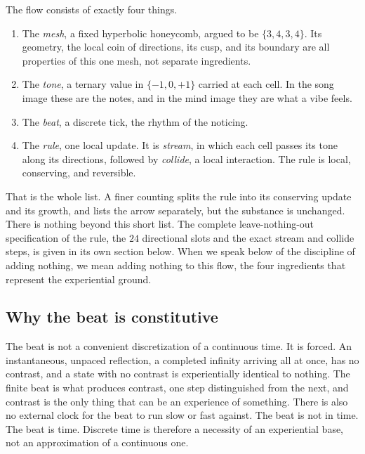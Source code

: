\begin{axiom}
The flow consists of exactly four things.
\begin{enumerate}
\item The \emph{mesh}, a fixed hyperbolic honeycomb, argued to be $\{3,4,3,4\}$. Its geometry, the local coin of
directions, its cusp, and its boundary are all properties of this one mesh, not separate ingredients.
\item The \emph{tone}, a ternary value in $\{-1, 0, +1\}$ carried at each cell. In the song image these are the
notes, and in the mind image they are what a vibe feels.
\item The \emph{beat}, a discrete tick, the rhythm of the noticing.
\item The \emph{rule}, one local update. It is \emph{stream}, in which each cell passes its tone along its
directions, followed by \emph{collide}, a local interaction. The rule is local, conserving, and reversible.
\end{enumerate}
\end{axiom}

That is the whole list. A finer counting splits the rule into its conserving update and its growth, and lists the
arrow separately, but the substance is unchanged. There is nothing beyond this short list. The complete
leave-nothing-out specification of the rule, the $24$ directional slots and the exact stream and collide steps,
is given in its own section below. When we speak below of the discipline of adding nothing, we mean adding nothing
to this flow, the four ingredients that represent the experiential ground.

\subsection{Why the beat is constitutive}

The beat is not a convenient discretization of a continuous time. It is forced. An instantaneous, unpaced
reflection, a completed infinity arriving all at once, has no contrast, and a state with no contrast is
experientially identical to nothing. The finite beat is what produces contrast, one step distinguished from the
next, and contrast is the only thing that can be an experience of something. There is also no external clock for
the beat to run slow or fast against. The beat is not in time. The beat is time. Discrete time is therefore a
necessity of an experiential base, not an approximation of a continuous one.

